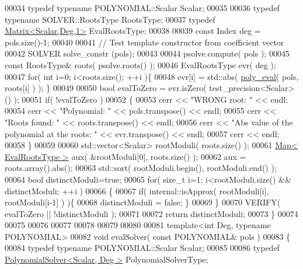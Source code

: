 \begin{DoxyCode}
00034   \textcolor{keyword}{typedef} \textcolor{keyword}{typename} POLYNOMIAL::Scalar Scalar;
00035 
00036   \textcolor{keyword}{typedef} \textcolor{keyword}{typename} SOLVER::RootsType    RootsType;
00037   \textcolor{keyword}{typedef} \hyperlink{group___core___module}{Matrix<Scalar,Deg,1>}          EvalRootsType;
00038 
00039   \textcolor{keyword}{const} Index deg = pols.size()-1;
00040 
00041   \textcolor{comment}{// Test template constructor from coefficient vector}
00042   SOLVER solve\_constr (pols);
00043 
00044   psolve.compute( pols );
00045   \textcolor{keyword}{const} RootsType& roots( psolve.roots() );
00046   EvalRootsType evr( deg );
00047   \textcolor{keywordflow}{for}( \textcolor{keywordtype}{int} i=0; i<roots.size(); ++i )\{
00048     evr[i] = std::abs( \hyperlink{namespace_eigen_adb64ffddaa9e83634e3ab0e3fd3664f5}{poly\_eval}( pols, roots[i] ) ); \}
00049 
00050   \textcolor{keywordtype}{bool} evalToZero = evr.isZero( test\_precision<Scalar>() );
00051   \textcolor{keywordflow}{if}( !evalToZero )
00052   \{
00053     cerr << \textcolor{stringliteral}{"WRONG root: "} << endl;
00054     cerr << \textcolor{stringliteral}{"Polynomial: "} << pols.transpose() << endl;
00055     cerr << \textcolor{stringliteral}{"Roots found: "} << roots.transpose() << endl;
00056     cerr << \textcolor{stringliteral}{"Abs value of the polynomial at the roots: "} << evr.transpose() << endl;
00057     cerr << endl;
00058   \}
00059 
00060   std::vector<Scalar> rootModuli( roots.size() );
00061   \hyperlink{group___core___module_class_eigen_1_1_map}{Map< EvalRootsType >} aux( &rootModuli[0], roots.size() );
00062   aux = roots.array().abs();
00063   std::sort( rootModuli.begin(), rootModuli.end() );
00064   \textcolor{keywordtype}{bool} distinctModuli=\textcolor{keyword}{true};
00065   \textcolor{keywordflow}{for}( \textcolor{keywordtype}{size\_t} i=1; i<rootModuli.size() && distinctModuli; ++i )
00066   \{
00067     \textcolor{keywordflow}{if}( internal::isApprox( rootModuli[i], rootModuli[i-1] ) )\{
00068       distinctModuli = \textcolor{keyword}{false}; \}
00069   \}
00070   VERIFY( evalToZero || !distinctModuli );
00071 
00072   \textcolor{keywordflow}{return} distinctModuli;
00073 \}
00074 
00075 
00076 
00077 
00078 
00079 
00080 
00081 \textcolor{keyword}{template}<\textcolor{keywordtype}{int} Deg, \textcolor{keyword}{typename} POLYNOMIAL>
00082 \textcolor{keywordtype}{void} evalSolver( \textcolor{keyword}{const} POLYNOMIAL& pols )
00083 \{
00084   \textcolor{keyword}{typedef} \textcolor{keyword}{typename} POLYNOMIAL::Scalar Scalar;
00085 
00086   \textcolor{keyword}{typedef} \hyperlink{class_eigen_1_1_polynomial_solver}{PolynomialSolver<Scalar, Deg >}              PolynomialSolverType;

\end{DoxyCode}
